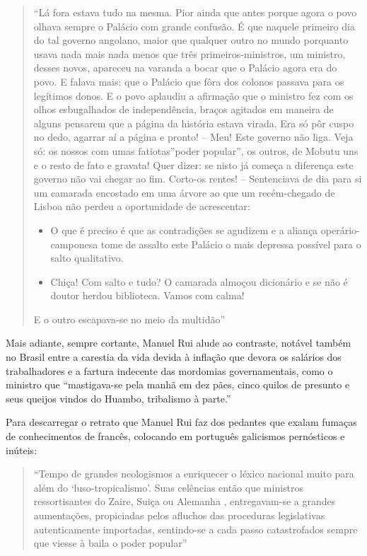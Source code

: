 \documentclass[
  letterpaper,
  DIV=11,
  numbers=noendperiod]{scrreprt}
\begin{document}
\begin{quote}
``Lá fora estava tudo na mesma. Pior ainda que antes porque agora o povo
olhava sempre o Palácio com grande confusão. É que naquele primeiro dia
do tal governo angolano, maior que qualquer outro no mundo porquanto
usava nada mais nada menos que três primeiros-ministros, um ministro,
desses novos, apareceu na varanda a bocar que o Palácio agora era do
povo. E falava mais: que o Palácio que fôra dos colonos passava para os
legítimos donos. E o povo aplaudiu a afirmação que o ministro fez com os
olhos esbugalhados de independência, braços agitados em maneira de
alguns pensarem que a página da história estava virada. Era só pôr cuspo
no dedo, agarrar aí a página e pronto! -- Meu! Este governo não liga.
Veja só: os nossos com umas fatiotas''poder popular'', os outros, de
Mobutu uns e o resto de fato e gravata! Quer dizer: se nisto já começa a
diferença este governo não vai chegar ao fim. Corto-os rentes! --
Sentenciava de dia para si um camarada encostado em uma árvore ao que um
recém-chegado de Lisboa não perdeu a oportunidade de acrescentar:

\begin{itemize}
\item
  O que é preciso é que as contradições se agudizem e a aliança
  operário-camponesa tome de assalto este Palácio o mais depressa
  possível para o salto qualitativo.
\item
  Chiça! Com salto e tudo? O camarada almoçou dicionário e se não é
  doutor herdou biblioteca. Vamos com calma!
\end{itemize}

E o outro escapava-se no meio da multidão''
\end{quote}

Mais adiante, sempre cortante, Manuel Rui alude ao contraste, notável
também no Brasil entre a carestia da vida devida à inflação que devora
os salários dos trabalhadores e a fartura indecente das mordomias
governamentais, como o ministro que ``mastigava-se pela manhã em dez
pães, cinco quilos de presunto e seus queijos vindos do Huambo,
tribalismo à parte.''

Para descarregar o retrato que Manuel Rui faz dos pedantes que exalam
fumaças de conhecimentos de francês, colocando em português galicismos
pernósticos e inúteis:

\begin{quote}
``Tempo de grandes neologismos a enriquecer o léxico nacional muito para
além do `luso-tropicalismo'. Suas celências então que ministros
ressortisantes do Zaire, Suiça ou Alemanha , entregavam-se a grandes
aumentações, propiciadas pelos afluchos das proceduras legislativas
autenticamente importadas, sentindo-se a cada passo catastrofados sempre
que viesse à baila o poder popular''
\end{quote}
\end{document}
